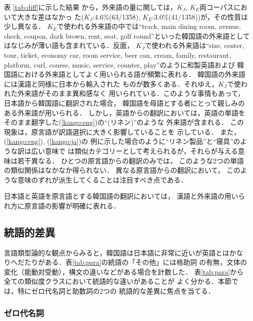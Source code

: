 表 \ref{tab:diff}に示した結果
から，外来語の量に関しては，$K_J$, $K_E$両コーパスにおいて大きな差はなかっ
た($K_J$:4.6\%(63/1358), $K_E$:3.0\%(41/1358))が，その性質は少し異なる． 
$K_E$で使われる外来語の中では``track, main dining room, avenue,
check, coupon, dark brown, rent, seat, golf
round''といった韓国語の外来語としてはなじみが薄い語も含まれている．反面，
$K_J$で使われる外来語は``size, center, tour, ticket, economy car, room
service, beer can, cream, family, restaurant, platform, curl,
course, music, service, counter, play''のように和製英語および
韓国語における外来語としてよく用いられる語が頻繁に表れる．
韓国語の外来語には漢語と同様に日本から輸入された
ものが数多くある．それゆえ，$K_J$で使われた外来語がそのまま異和感なく
用いられている．このような事情もあって，日本語から韓国語に翻訳された場合，
韓国語を母語とする者にとって親しみのある外来語が用いられる．
しかし，英語からの翻訳においては，英語の単語を
そのまま翻字した(\ref{kango:eng})の``(リネン)''のような
外来語が含まれる．
この現象は，原言語が訳語選択に大きく影響していることを
示している． また，(\ref{kango:eng}), (\ref{kango:ja})の
例に示した場合のように``リネン製品''と``寝具''のような訳は広い意味で
は類似カテゴリーとして考えられるが，それらが与える意味は若干異なる．
ひとつの原言語からの翻訳のみでは，
このような2つの単語の類似関係はなかなか得られない．
異なる原言語からの翻訳において，
このような意味のずれが派生してくることは注目すべき点である．

日本語と英語を原言語とする韓国語の翻訳においては，
漢語と外来語の用いられ方に原言語の影響が明確に表れる．


\subsection{統語的差異}
\label{sec:syntax}
言語類型論的な観点からみると，韓国語は日本語に非常に近いが英語とはかな
りへだたりがある．表\ref{tab:para}の統語の「その他」には格助詞
の有無，文体の変化（能動対受動），構文の違いなどがある場合を計数した．
表\ref{tab:para}から全ての類似度クラスにおいて統語的な違いがあることが
よく分かる．本節では，特にゼロ代名詞と助数詞の2つの
統語的な差異に焦点を当てる．

\subsubsection{ゼロ代名詞}
\label{sec:zero}

